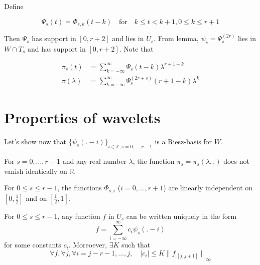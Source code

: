 \documentclass[a4paper, 11pt]{article}
\begin{document}
Define 

\begin{equation*}
  \Psi_{s}(t) = \Phi_{s,k}(t-k) \quad \text{for} \quad k \leq t < k+1, 0 \leq k \leq r+1
\end{equation*}

Then $\Psi_s$ has support in $[0, r+2]$ and lies in $U_s$. From lemma, $\psi_s = \Psi_s^{(2r)}$ lies in $W \cap T_s$ and 
has support in $[0, r+2]$. Note that

\begin{align*}
  \pi_s(t) &= \sum_{k = -\infty}^{\infty} \Psi_s(t-k) \lambda^{r+1+k} \\
  \pi(\lambda) &= \sum_{k = -\infty}^{\infty} \Psi_s^{(2r+s)}(r+1-k) \lambda^{k}
\end{align*}

\section{Properties of wavelets}

Let's show now that ${\{\psi_s(.-i)\}}_{i \in \mathbb{Z}, s=0, \ldots, r-1}$ is a Riesz-basis for $W$.

\begin{lem}{3.1}
  For $s=0, \ldots, r-1$ and any real number $\lambda$, the function $\pi_s = \pi_s(\lambda,.)$ does not vanish 
  identically on $\mathbb{R}$.
\end{lem}

\begin{lem}{3.2}
  For $0 \leq s \leq r-1$, the functions $\Phi_{s,i}$ ($i=0, \ldots, r+1$) are linearly independent on $[0, 
  \frac{1}{2}]$ and on $[\frac{1}{2}, 1]$.
\end{lem}

\begin{lem}{3.3}
  For $0 \leq s \leq r-1$, any function $f$ in $U_s$ can be written uniquely in the form 
  \begin{equation*}
    f = \sum_{i = -\infty}^{\infty} c_i \psi_s(.-i)
  \end{equation*}
  for some constants $c_i$. Moreoever, $\exists K$ such that
  \begin{equation*}
    \forall f, \forall j, \forall i = j-r-1, \ldots, j, \quad |c_i| \leq K {\|f_{|[j,j+1]}\|}_{\infty}
  \end{equation*}
\end{lem}
\end{document}
